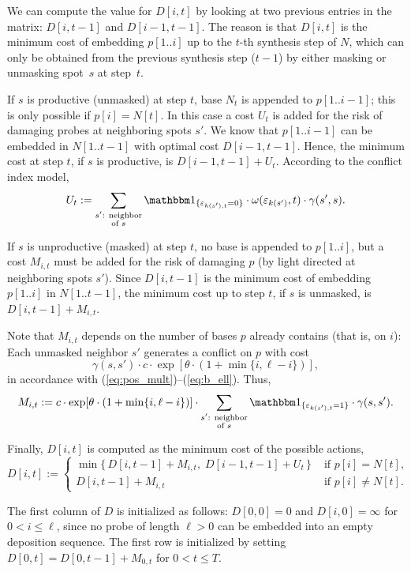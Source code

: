 We can compute the value for $D[i,t]$ by looking at two previous entries in the
matrix: $D[i,t-1]$ and $D[i-1,t-1]$. The reason is that $D[i,t]$ is the minimum
cost of embedding $p[1..i]$ up to the $t$-th synthesis step of $N$, which can
only be obtained from the previous synthesis step ($t-1$) by either masking or
unmasking spot~$s$ at step~$t$.

If $s$ is productive (unmasked) at step $t$, base $N_t$ is appended to
$p[1..i-1]$; this is only possible if $p[i]=N[t]$. In this case a cost $U_t$ is
added for the risk of damaging probes at neighboring spots $s'$. We know that
$p[1..i-1]$ can be embedded in $N[1..t-1]$ with optimal cost $D[i-1,t-1]$.
Hence, the minimum cost at step $t$, if $s$ is productive, is $D[i-1,t-1] +
U_t$.  According to the conflict index model,
\[
U_t := \sum_{\substack{s'\text{: neighbor}\\\text{of } s}}
  \Ind{\eps_{k(s'),t}=0}
  \cdot \omega(\eps_{k(s')},t)
  \cdot \gamma(s',s).
\]

If $s$ is unproductive (masked) at step $t$, no base is appended to $p[1..i]$,
but a cost $M_{i,t}$ must be added for the risk of damaging $p$ (by light
directed at neighboring spots $s'$). Since $D[i,t-1]$ is the minimum cost of
embedding $p[1..i]$ in $N[1..t-1]$, the minimum cost up to step $t$, if $s$ is
unmasked, is $D[i,t-1] + M_{i,t}$.

Note that $M_{i,t}$ depends on the number of bases $p$ already contains (that
is, on $i$): Each unmasked neighbor $s'$ generates a conflict on $p$ with cost
\[
\gamma(s,s') \cdot c \cdot \exp[\theta\cdot (1+\min\{i,\ell-i\})],
\]
in accordance with (\ref{eq:pos_mult})--(\ref{eq:b_ell}). Thus,
\[
M_{i,t} := c \cdot \exp[\theta\cdot (1+\min\{i,\ell-i\})] \cdot
\sum_{\substack{s'\text{: neighbor}\\\text{of } s}}
\Ind{\eps_{k(s'),t}=1}  \cdot \gamma(s,s').
\]

Finally, $D[i,t]$ is computed as the minimum cost of the possible actions,
\[
D[i,t] := \begin{cases}
  \min \{\, D[i,t-1] + M_{i,t},\;  D[i-1,t-1] + U_t \,\}
  & \text{ if $p[i]=N[t]$,}\\
  D[i,t-1] + M_{i,t}
  & \text{ if $p[i]\neq N[t]$.}
  \end{cases}
\]

The first column of $D$ is initialized as follows: $D[0,0] = 0$ and
$D[i,0] = \infty$ for $0 < i \leq \ell$, since no probe of length $\ell > 0$ can
be embedded into an empty deposition sequence. The first row is initialized by
setting $D[0,t] = D[0,t-1]+M_{0,t}$ for $0<t\leq T$.

